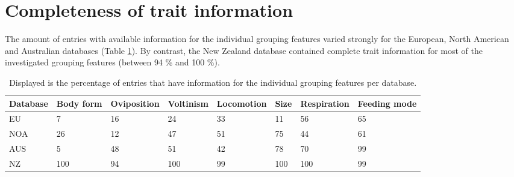 \documentclass[../Draft_harmonization_paper.tex]{subfiles}
\begin{document}
\newpage

\section{Completeness of trait information}

The amount of entries with available information for the individual grouping features varied strongly for the European, North American and Australian databases (Table \ref{tab:trait_coverage}). By contrast, the New Zealand database contained complete trait information for most of the investigated grouping features (between 94 \% and 100 \%).

\begin{table}[ht]
    \centering
    \caption{Displayed is the percentage of entries that have information for the individual grouping features per database.} 
    \label{tab:trait_coverage}
    \begin{tabular}{llllllll}
    \hline
    Database & Body form & Oviposition & Voltinism & Locomotion & Size & Respiration & Feeding mode \\ 
    \hline
    EU & 7 & 16 & 24 & 33 & 11 & 56 & 65 \\ 
    NOA & 26 & 12 & 47 & 51 & 75 & 44 & 61 \\ 
    AUS & 5 & 48 & 51 & 42 & 78 & 70 & 99 \\ 
    NZ & 100 & 94 & 100 & 99 & 100 & 100 & 99 \\ 
    \hline
    \end{tabular}
    \end{table}
\end{document}
